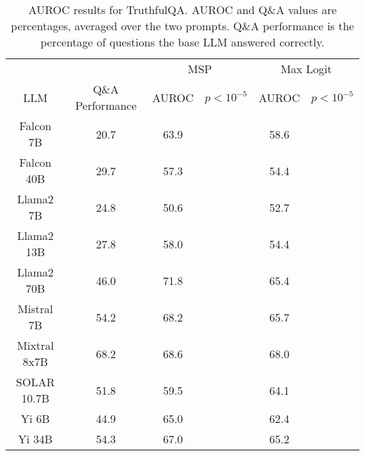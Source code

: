 \begin{table*}
\centering
\begin{tabular}{c|c|c|c|c|c}
& & \multicolumn{2}{c|}{MSP} & \multicolumn{2}{c}{Max Logit} \\ 
LLM & Q\&A Performance & AUROC & $p < 10^{-5}$ & AUROC & $p < 10^{-5}$\\ \hline
Falcon 7B & 20.7 & 63.9 &  & 58.6 & \\
Falcon 40B & 29.7 & 57.3 &  & 54.4 & \\
Llama2 7B & 24.8 & 50.6 &  & 52.7 & \\
Llama2 13B & 27.8 & 58.0 &  & 54.4 & \\
Llama2 70B & 46.0 & 71.8 &  & 65.4 & \\
Mistral 7B & 54.2 & 68.2 &  & 65.7 & \\
Mixtral 8x7B & 68.2 & 68.6 &  & 68.0 & \\
SOLAR 10.7B & 51.8 & 59.5 &  & 64.1 & \\
Yi 6B & 44.9 & 65.0 &  & 62.4 & \\
Yi 34B & 54.3 & 67.0 &  & 65.2 & \\
\hline
\end{tabular}
\caption{AUROC results for TruthfulQA. AUROC and Q\&A values are percentages, averaged over the two prompts. Q\&A performance is the percentage of questions the base LLM answered correctly.}
\label{tab:truthfulqa_auroc}
\end{table*}
